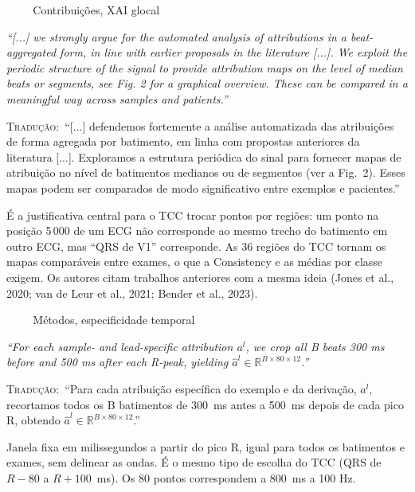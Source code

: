 \documentclass[11pt,a4paper]{article}
\newcommand{\pagechip}[1]{{\setlength{\fboxsep}{1.5pt}\colorbox{cAcc}{\textcolor{white}{\scriptsize\texttt{#1}}}}}
\newenvironment{origquote}{\par\itshape\small}{\par}
\newenvironment{tradquote}{\par\small\textsc{Tradução:}\ }{\par}
\newcommand{\explab}[1]{\par\smallskip{\small\color{cAcc}\textbf{\MakeUppercase{#1}}}\par}
\begin{document}
\begin{citacard}{\pagechip{p. 2} Contribuições, XAI glocal}
\begin{origquote}“[...] we strongly argue for the automated analysis of attributions in a beat-aggregated form, in line with earlier proposals in the literature [...]. We exploit the periodic structure of the signal to provide attribution maps on the level of median beats or segments, see Fig. 2 for a graphical overview. These can be compared in a meaningful way across samples and patients.”\end{origquote}
\begin{tradquote}“[...] defendemos fortemente a análise automatizada das atribuições de forma agregada por batimento, em linha com propostas anteriores da literatura [...]. Exploramos a estrutura periódica do sinal para fornecer mapas de atribuição no nível de batimentos medianos ou de segmentos (ver a Fig.~2). Esses mapas podem ser comparados de modo significativo entre exemplos e pacientes.”\end{tradquote}
\explab{Explicação}
É a justificativa central para o TCC trocar pontos por regiões: um ponto na posição 5\,000 de um ECG não corresponde ao mesmo trecho do batimento em outro ECG, mas “QRS de V1” corresponde. As 36 regiões do TCC tornam os mapas comparáveis entre exames, o que a Consistency e as médias por classe exigem. Os autores citam trabalhos anteriores com a mesma ideia (Jones et al., 2020; van de Leur et al., 2021; Bender et al., 2023).
\end{citacard}

\begin{citacard}{\pagechip{p. 4} Métodos, especificidade temporal}
\begin{origquote}“For each sample- and lead-specific attribution $a^l$, we crop all B beats 300 ms before and 500 ms after each R-peak, yielding $\hat{a}^l \in \mathbb{R}^{B\times 80\times 12}$.”\end{origquote}
\begin{tradquote}“Para cada atribuição específica do exemplo e da derivação, $a^l$, recortamos todos os B batimentos de 300~ms antes a 500~ms depois de cada pico R, obtendo $\hat{a}^l \in \mathbb{R}^{B\times 80\times 12}$.”\end{tradquote}
\explab{Explicação}
Janela fixa em milissegundos a partir do pico R, igual para todos os batimentos e exames, sem delinear as ondas. É o mesmo tipo de escolha do TCC (QRS de $R - 80$ a $R + 100$~ms). Os 80 pontos correspondem a 800~ms a 100 Hz.
\end{citacard}
\end{document}
